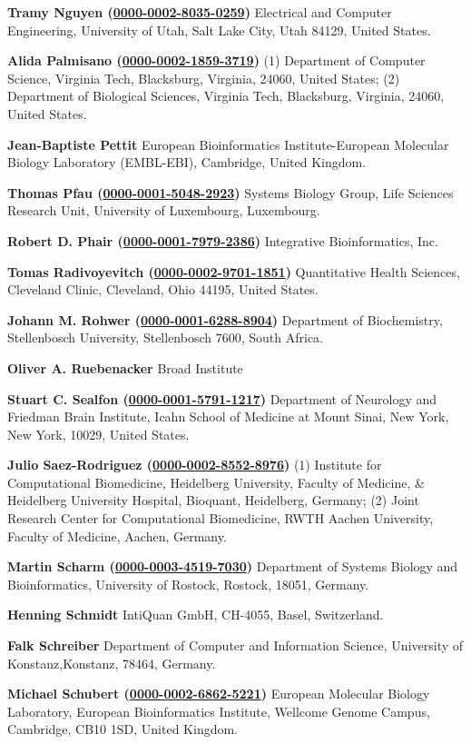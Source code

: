 \documentclass{sbml-paper}
\newcommand{\orcid}[1]{\href{https://orcid.org/#1}{#1}}
\begin{document}
\textbf{Tramy Nguyen (\orcid{0000-0002-8035-0259})} Electrical and Computer Engineering, University of Utah, Salt Lake City, Utah 84129, United States.

\textbf{Alida Palmisano (\orcid{0000-0002-1859-3719})} (1) Department of Computer Science, Virginia Tech, Blacksburg, Virginia, 24060,  United States; (2) Department of Biological Sciences, Virginia Tech, Blacksburg, Virginia, 24060, United States.

\textbf{Jean-Baptiste Pettit} European Bioinformatics Institute-European Molecular Biology Laboratory (EMBL-EBI), Cambridge, United Kingdom.

\textbf{Thomas Pfau (\orcid{0000-0001-5048-2923})} Systems Biology Group, Life Sciences Research Unit, University of Luxembourg, Luxembourg.

\textbf{Robert D. Phair (\orcid{0000-0001-7979-2386})} Integrative Bioinformatics, Inc.

\textbf{Tomas Radivoyevitch (\orcid{0000-0002-9701-1851})} Quantitative Health Sciences, Cleveland Clinic, Cleveland, Ohio 44195, United States.

\textbf{Johann M. Rohwer (\orcid{0000-0001-6288-8904})} Department of Biochemistry, Stellenbosch University, Stellenbosch 7600, South Africa.

\textbf{Oliver A. Ruebenacker} Broad Institute

\textbf{Stuart C. Sealfon (\orcid{0000-0001-5791-1217})} Department of Neurology and Friedman Brain Institute, Icahn School of Medicine at Mount Sinai, New York, New York, 10029, United States.

\textbf{Julio Saez-Rodriguez (\orcid{0000-0002-8552-8976})} (1) Institute for Computational Biomedicine, Heidelberg University, Faculty of Medicine, \& Heidelberg University Hospital, Bioquant, Heidelberg, Germany; (2) Joint Research Center for Computational Biomedicine, RWTH Aachen University, Faculty of Medicine, Aachen, Germany.

\textbf{Martin Scharm (\orcid{0000-0003-4519-7030})} Department of Systems Biology and Bioinformatics, University of Rostock, Rostock, 18051, Germany.

\textbf{Henning Schmidt} IntiQuan GmbH, CH-4055, Basel, Switzerland.

\textbf{Falk Schreiber} Department of Computer and Information Science, University of Konstanz,Konstanz, 78464, Germany.

\textbf{Michael Schubert (\orcid{0000-0002-6862-5221})} European Molecular Biology Laboratory, European Bioinformatics Institute, Wellcome Genome Campus, Cambridge, CB10 1SD, United Kingdom.
\end{document}
